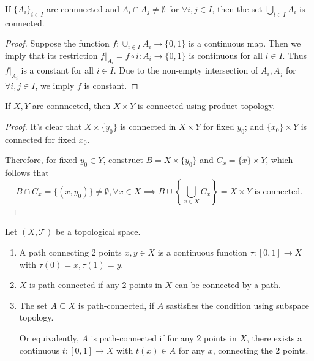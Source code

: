 \begin{proposition}\label{pro:4:10}
If $\{A_i\}_{i\in I}$ are connnected and $A_i\cap A_j\ne\emptyset$ for $\forall i,j\in I$, then the set $\bigcup_{i\in I}A_i$ is connected.
\end{proposition}

\begin{proof}
Suppose the function $f:\cup_{i\in I}A_i\to\{0,1\}$ is a continuous map. Then we imply that its restriction $f|_{A_i} = f\circ i: A_i\to\{0,1\}$ is continuous for all $i\in I$. Thus $f|_{A_i}$ is a constant for all $i\in I$. Due to the non-empty intersection of $A_i,A_j$ for $\forall i,j\in I$, we imply $f$ is constant.
\end{proof}

\begin{proposition}
If $X,Y$ are connnected, then $X\times Y$ is connected using product topology.
\end{proposition}
\begin{proof}
It's clear that $X\times \{y_0\}$ is connected in $X\times Y$ for fixed $y_0$; and $\{x_0\}\times Y$ is connected for fixed $x_0$.

Therefore, for fixed $y_0\in Y$, construct $B=X\times \{y_0\}$ and $C_x=\{x\}\times Y$, which follows that
\[
B\cap C_x=\{(x,y_0)\}\ne\emptyset,\forall x\in X\implies
B\cup\left\{\bigcup_{x\in X}C_x\right\}=X\times Y\text{ is connected.}
\]
\end{proof}

\begin{definition}
Let $(X,\mathcal{T})$ be a topological space. 
\begin{enumerate}
\item
A path connecting 2 points $x,y\in X$ is a continuous function $\tau:[0,1]\to X$ with $\tau(0)=x,\tau(1)=y$.
\item
$X$ is path-connected if any 2 points in $X$ can be connected by a path.
\item
The set $A\subseteq X$ is path-connected, if $A$ sastisfies the condition using subspace topology.

Or equivalently,  $A$ is path-connected if for any 2 points in $X$, there exists a continuous $t:[0,1]\to X$ with $t(x)\in A$ for any $x$, connecting the 2 points.
\end{enumerate}
\end{definition}


























